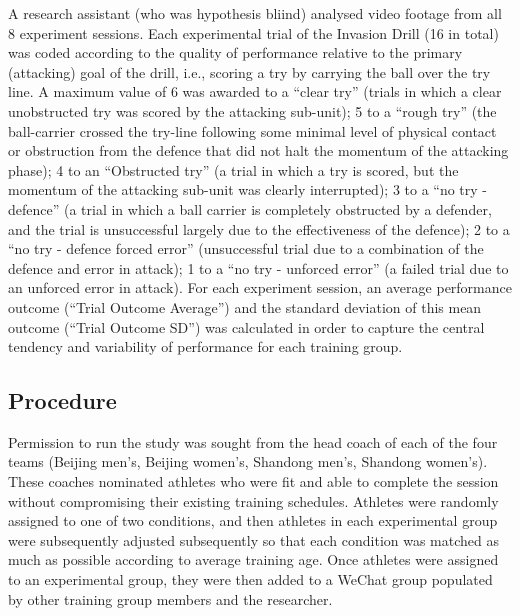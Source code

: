 A research assistant (who was hypothesis bliind) analysed video footage from all 8 experiment sessions.  Each experimental trial of the Invasion Drill (16 in total) was coded according to the quality of performance relative to the primary (attacking) goal of the drill, i.e., scoring a try by carrying the ball over the try line.  A maximum value of 6 was awarded to a ``clear try'' (trials in which a clear unobstructed try was scored by the attacking sub-unit); 5 to a ``rough try'' (the ball-carrier crossed the try-line following some minimal level of physical contact or obstruction from the defence that did not halt the momentum of the attacking phase); 4 to an ``Obstructed try'' (a trial in which a try is scored, but the momentum of the attacking sub-unit was clearly interrupted); 3 to a ``no try - defence''  (a trial in which a ball carrier is completely obstructed by a defender, and the trial is unsuccessful largely due to the effectiveness of the defence); 2 to a ``no try - defence forced error'' (unsuccessful trial due to a combination of the defence and error in attack); 1 to a ``no try - unforced error'' (a failed trial due to an unforced error in attack).  For each experiment session, an average performance outcome (``Trial Outcome Average'') and the standard deviation of this mean outcome (``Trial Outcome SD'') was calculated in order to capture the central tendency and variability of performance for each training group.


\subsection{Procedure}
Permission to run the study was sought from the head coach of each of the four teams (Beijing men's, Beijing women's, Shandong men's, Shandong women's).  These coaches nominated athletes who were fit and able to complete the session without compromising their existing training schedules.  Athletes were randomly assigned to one of two conditions, and then athletes in each experimental group were subsequently adjusted subsequently so that each condition was matched as much as possible according to average training age. Once athletes were assigned to an experimental group, they were then added to a WeChat group populated by other training group members and the researcher.

